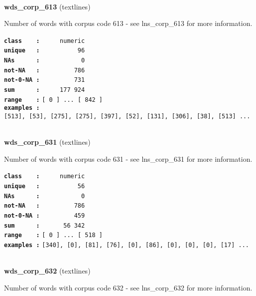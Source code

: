 \documentclass[]{article}
\begin{document}
~

\textbf{wds\_corp\_613} (textlines)

Number of words with corpus code 613 - see lns\_corp\_613 for more
information.

\textbf{\texttt{class\ \ \ \ :}} \texttt{~~~~~numeric}\\
\textbf{\texttt{unique\ \ \ :}} \texttt{~~~~~~~~~~96}\\
\textbf{\texttt{NAs\ \ \ \ \ \ :}} \texttt{~~~~~~~~~~~0}\\
\textbf{\texttt{not-NA\ \ \ :}} \texttt{~~~~~~~~~786}\\
\textbf{\texttt{not-0-NA\ :}} \texttt{~~~~~~~~~731}\\
\textbf{\texttt{sum\ \ \ \ \ \ :}} \texttt{~~~~~177~924}\\
\textbf{\texttt{range\ \ \ \ :}}
\texttt{{[}\ 0\ {]}\ ...\ {[}\ 842\ {]}}\\
\textbf{\texttt{examples\ :}}
\texttt{{[}513{]},\ {[}53{]},\ {[}275{]},\ {[}275{]},\ {[}397{]},\ {[}52{]},\ {[}131{]},\ {[}306{]},\ {[}38{]},\ {[}513{]}\ ...}\\

~

\textbf{wds\_corp\_631} (textlines)

Number of words with corpus code 631 - see lns\_corp\_631 for more
information.

\textbf{\texttt{class\ \ \ \ :}} \texttt{~~~~~numeric}\\
\textbf{\texttt{unique\ \ \ :}} \texttt{~~~~~~~~~~56}\\
\textbf{\texttt{NAs\ \ \ \ \ \ :}} \texttt{~~~~~~~~~~~0}\\
\textbf{\texttt{not-NA\ \ \ :}} \texttt{~~~~~~~~~786}\\
\textbf{\texttt{not-0-NA\ :}} \texttt{~~~~~~~~~459}\\
\textbf{\texttt{sum\ \ \ \ \ \ :}} \texttt{~~~~~~56~342}\\
\textbf{\texttt{range\ \ \ \ :}}
\texttt{{[}\ 0\ {]}\ ...\ {[}\ 518\ {]}}\\
\textbf{\texttt{examples\ :}}
\texttt{{[}340{]},\ {[}0{]},\ {[}81{]},\ {[}76{]},\ {[}0{]},\ {[}86{]},\ {[}0{]},\ {[}0{]},\ {[}0{]},\ {[}17{]}\ ...}\\

~

\textbf{wds\_corp\_632} (textlines)

Number of words with corpus code 632 - see lns\_corp\_632 for more
information.
\end{document}
